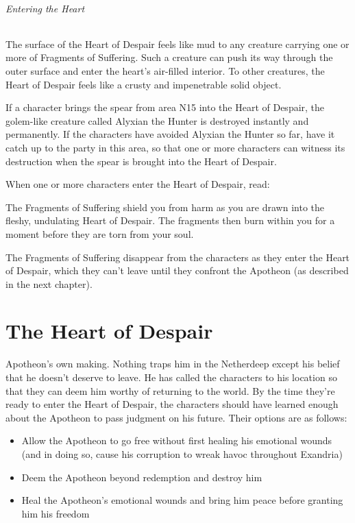 \documentclass[10pt,a4paper,twoside,fancy,bg=print,twocolumn,openany,nodeprecatedcode]{dndbook}
\begin{document}
\subparagraph{Entering the Heart}
The surface of the Heart of Despair feels like mud to any creature carrying one or more of Fragments of Suffering. Such a creature can push its way through the outer surface and enter the heart's air-filled interior. To other creatures, the Heart of Despair feels like a crusty and impenetrable solid object.

If a character brings the spear from area N15 into the Heart of Despair, the golem-like creature called Alyxian the Hunter is destroyed instantly and permanently. If the characters have avoided Alyxian the Hunter so far, have it catch up to the party in this area, so that one or more characters can witness its destruction when the spear is brought into the Heart of Despair.

When one or more characters enter the Heart of Despair, read:

\begin{DndReadAloud}{}
The Fragments of Suffering shield you from harm as you are drawn into the fleshy, undulating Heart of Despair. The fragments then burn within you for a moment before they are torn from your soul.

\end{DndReadAloud}

The Fragments of Suffering disappear from the characters as they enter the Heart of Despair, which they can't leave until they confront the Apotheon (as described in the next chapter).

\chapter*{The Heart of Despair}
 Apotheon's own making. Nothing traps him in the Netherdeep except his belief that he doesn't deserve to leave. He has called the characters to his location so that they can deem him worthy of returning to the world. By the time they're ready to enter the Heart of Despair, the characters should have learned enough about the Apotheon to pass judgment on his future. Their options are as follows:



\begin{itemize}
\item Allow the Apotheon to go free without first healing his emotional wounds (and in doing so, cause his corruption to wreak havoc throughout Exandria)
\item Deem the Apotheon beyond redemption and destroy him
\item Heal the Apotheon's emotional wounds and bring him peace before granting him his freedom
\end{itemize}
\end{document}
